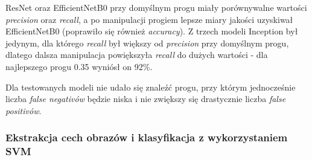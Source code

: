 \documentclass[polish,12pt]{aghthesis}
\begin{document}
ResNet oraz EfficientNetB0 przy domyślnym progu miały porównywalne wartości \textit{precision} oraz \textit{recall}, a po manipulacji progiem lepsze miary jakości uzyskiwał EfficientNetB0 (poprawiło się również \textit{accuracy}). 
Z trzech modeli Inception był jedynym, dla którego \textit{recall} był większy od \textit{precision} przy domyślnym progu, dlatego dalsza manipulacja powiększyła \textit{recall} do dużych wartości - dla najlepszego progu 0.35 wyniósł on 92\%.

Dla testowanych modeli nie udało się znaleźć progu, przy którym jednocześnie liczba \textit{false negativów} będzie niska i nie zwiększy się drastycznie liczba \textit{false positivów}.

\subsubsection{Ekstrakcja cech obrazów i klasyfikacja z wykorzystaniem SVM}
\end{document}
